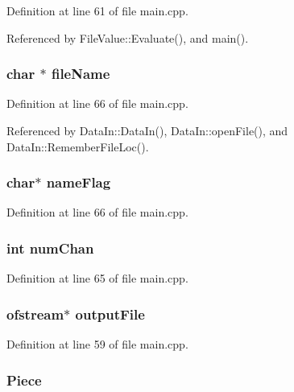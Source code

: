 Definition at line 61 of file main.cpp.

Referenced by File\-Value::Evaluate(), and main().
\subsubsection{\setlength{\rightskip}{0pt plus 5cm}char $\ast$ {\bf file\-Name}}\label{main_8cpp_a6}




Definition at line 66 of file main.cpp.

Referenced by Data\-In::Data\-In(), Data\-In::open\-File(), and Data\-In::Remember\-File\-Loc().
\subsubsection{\setlength{\rightskip}{0pt plus 5cm}char$\ast$ {\bf name\-Flag}}\label{main_8cpp_a5}




Definition at line 66 of file main.cpp.
\subsubsection{\setlength{\rightskip}{0pt plus 5cm}int {\bf num\-Chan}}\label{main_8cpp_a4}




Definition at line 65 of file main.cpp.
\subsubsection{\setlength{\rightskip}{0pt plus 5cm}ofstream$\ast$ {\bf output\-File}}\label{main_8cpp_a0}




Definition at line 59 of file main.cpp.
\subsubsection{ {\bf Piece}}\label{main_8cpp_a8}




